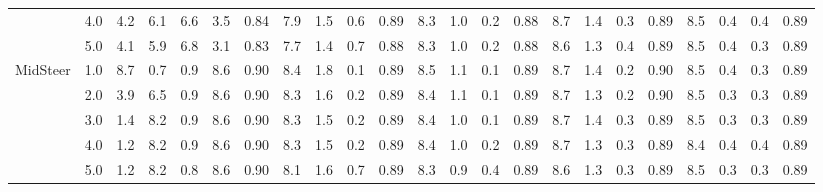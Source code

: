 \begin{table}
{\begin{tabular}{lc|cc|ccc|cccc|cccc|cccc|cccc}
 & 4.0 & 4.2 & 6.1 & 6.6 & 3.5 & 0.84 & 7.9 & 1.5 & 0.6 & 0.89 & 8.3 & 1.0 & 0.2 & 0.88 & 8.7 & 1.4 & 0.3 & 0.89 & 8.5 & 0.4 & 0.4 & 0.89 \\
 & 5.0 & 4.1 & 5.9 & 6.8 & 3.1 & 0.83 & 7.7 & 1.4 & 0.7 & 0.88 & 8.3 & 1.0 & 0.2 & 0.88 & 8.6 & 1.3 & 0.4 & 0.89 & 8.5 & 0.4 & 0.3 & 0.89 \\
\cline{1-23}
\multirow{5}{*}{MidSteer} & 1.0 & 8.7 & 0.7 & 0.9 & 8.6 & 0.90 & 8.4 & 1.8 & 0.1 & 0.89 & 8.5 & 1.1 & 0.1 & 0.89 & 8.7 & 1.4 & 0.2 & 0.90 & 8.5 & 0.4 & 0.3 & 0.89 \\
 & 2.0 & 3.9 & 6.5 & 0.9 & 8.6 & 0.90 & 8.3 & 1.6 & 0.2 & 0.89 & 8.4 & 1.1 & 0.1 & 0.89 & 8.7 & 1.3 & 0.2 & 0.90 & 8.5 & 0.3 & 0.3 & 0.89 \\
 & 3.0 & 1.4 & 8.2 & 0.9 & 8.6 & 0.90 & 8.3 & 1.5 & 0.2 & 0.89 & 8.4 & 1.0 & 0.1 & 0.89 & 8.7 & 1.4 & 0.3 & 0.89 & 8.5 & 0.3 & 0.3 & 0.89 \\
 & 4.0 & 1.2 & 8.2 & 0.9 & 8.6 & 0.90 & 8.3 & 1.5 & 0.2 & 0.89 & 8.4 & 1.0 & 0.2 & 0.89 & 8.7 & 1.3 & 0.3 & 0.89 & 8.4 & 0.4 & 0.4 & 0.89 \\
 & 5.0 & 1.2 & 8.2 & 0.8 & 8.6 & 0.90 & 8.1 & 1.6 & 0.7 & 0.89 & 8.3 & 0.9 & 0.4 & 0.89 & 8.6 & 1.3 & 0.3 & 0.89 & 8.5 & 0.3 & 0.3 & 0.89 \\
\bottomrule
\end{tabular}}
\end{table}
